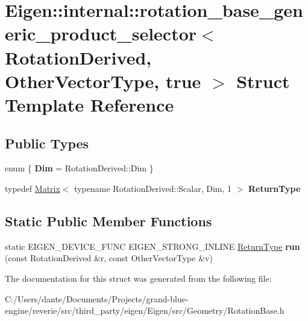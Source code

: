 \hypertarget{struct_eigen_1_1internal_1_1rotation__base__generic__product__selector_3_01_rotation_derived_00_945228ddac360fee065f79280b8a793b}{}\section{Eigen\+::internal\+::rotation\+\_\+base\+\_\+generic\+\_\+product\+\_\+selector$<$ Rotation\+Derived, Other\+Vector\+Type, true $>$ Struct Template Reference}
\label{struct_eigen_1_1internal_1_1rotation__base__generic__product__selector_3_01_rotation_derived_00_945228ddac360fee065f79280b8a793b}
\subsection*{Public Types}
\begin{DoxyCompactItemize}
\item 
\mbox{\label{struct_eigen_1_1internal_1_1rotation__base__generic__product__selector_3_01_rotation_derived_00_945228ddac360fee065f79280b8a793b_a1dbe76dff38b0237570289f5031ed6d7}} 
enum \{ {\bfseries Dim} = Rotation\+Derived\+::Dim
 \}
\item 
\mbox{\label{struct_eigen_1_1internal_1_1rotation__base__generic__product__selector_3_01_rotation_derived_00_945228ddac360fee065f79280b8a793b_a523751106cdef07ae1ea8cd07ab84d2a}} 
typedef \mbox{\hyperlink{class_eigen_1_1_matrix}{Matrix}}$<$ typename Rotation\+Derived\+::\+Scalar, Dim, 1 $>$ {\bfseries Return\+Type}
\end{DoxyCompactItemize}
\subsection*{Static Public Member Functions}
\begin{DoxyCompactItemize}
\item 
\mbox{\label{struct_eigen_1_1internal_1_1rotation__base__generic__product__selector_3_01_rotation_derived_00_945228ddac360fee065f79280b8a793b_acfd1798f465474344d93478b104ff21e}} 
static E\+I\+G\+E\+N\+\_\+\+D\+E\+V\+I\+C\+E\+\_\+\+F\+U\+NC E\+I\+G\+E\+N\+\_\+\+S\+T\+R\+O\+N\+G\+\_\+\+I\+N\+L\+I\+NE \mbox{\hyperlink{class_eigen_1_1_matrix}{Return\+Type}} {\bfseries run} (const Rotation\+Derived \&r, const Other\+Vector\+Type \&v)
\end{DoxyCompactItemize}


The documentation for this struct was generated from the following file\+:\begin{DoxyCompactItemize}
\item 
C\+:/\+Users/dante/\+Documents/\+Projects/grand-\/blue-\/engine/reverie/src/third\+\_\+party/eigen/\+Eigen/src/\+Geometry/Rotation\+Base.\+h\end{DoxyCompactItemize}

